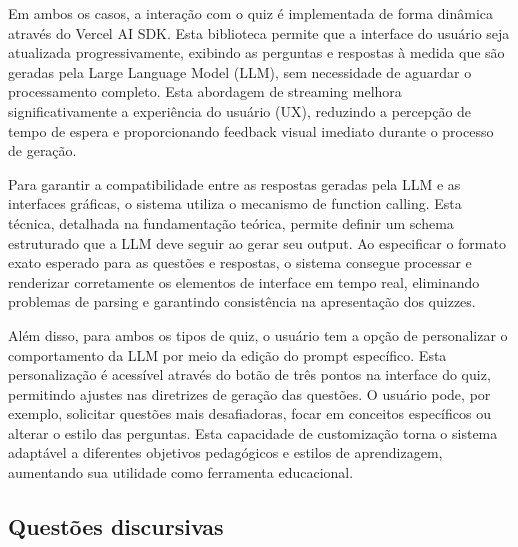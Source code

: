 \documentclass[tcc,capa]{texufpel}
\begin{document}
Em ambos os casos, a interação com o quiz é implementada de forma dinâmica através do Vercel AI SDK. Esta biblioteca permite que a interface do usuário seja atualizada progressivamente, exibindo as perguntas e respostas à medida que são geradas pela Large Language Model (LLM), sem necessidade de aguardar o processamento completo. Esta abordagem de streaming melhora significativamente a experiência do usuário (UX), reduzindo a percepção de tempo de espera e proporcionando feedback visual imediato durante o processo de geração.

Para garantir a compatibilidade entre as respostas geradas pela LLM e as interfaces gráficas, o sistema utiliza o mecanismo de function calling. Esta técnica, detalhada na fundamentação teórica, permite definir um schema estruturado que a LLM deve seguir ao gerar seu output. Ao especificar o formato exato esperado para as questões e respostas, o sistema consegue processar e renderizar corretamente os elementos de interface em tempo real, eliminando problemas de parsing e garantindo consistência na apresentação dos quizzes.

Além disso, para ambos os tipos de quiz, o usuário tem a opção de personalizar o comportamento da LLM por meio da edição do prompt específico. Esta personalização é acessível através do botão de três pontos na interface do quiz, permitindo ajustes nas diretrizes de geração das questões. O usuário pode, por exemplo, solicitar questões mais desafiadoras, focar em conceitos específicos ou alterar o estilo das perguntas. Esta capacidade de customização torna o sistema adaptável a diferentes objetivos pedagógicos e estilos de aprendizagem, aumentando sua utilidade como ferramenta educacional.

\subsection{Questões discursivas}
\end{document}
